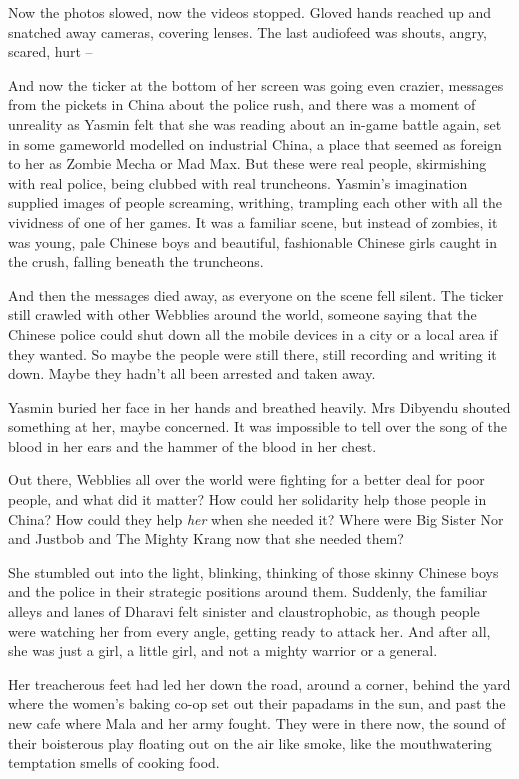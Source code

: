 Now the photos slowed, now the videos stopped. Gloved hands reached
up and snatched away cameras, covering lenses. The last audiofeed
was shouts, angry, scared, hurt --

And now the ticker at the bottom of her screen was going even
crazier, messages from the pickets in China about the police rush,
and there was a moment of unreality as Yasmin felt that she was
reading about an in-game battle again, set in some gameworld
modelled on industrial China, a place that seemed as foreign to her
as Zombie Mecha or Mad Max. But these were real people, skirmishing
with real police, being clubbed with real truncheons. Yasmin's
imagination supplied images of people screaming, writhing,
trampling each other with all the vividness of one of her games. It
was a familiar scene, but instead of zombies, it was young, pale
Chinese boys and beautiful, fashionable Chinese girls caught in the
crush, falling beneath the truncheons.

And then the messages died away, as everyone on the scene fell
silent. The ticker still crawled with other Webblies around the
world, someone saying that the Chinese police could shut down all
the mobile devices in a city or a local area if they wanted. So
maybe the people were still there, still recording and writing it
down. Maybe they hadn't all been arrested and taken away.

Yasmin buried her face in her hands and breathed heavily. Mrs
Dibyendu shouted something at her, maybe concerned. It was
impossible to tell over the song of the blood in her ears and the
hammer of the blood in her chest.

Out there, Webblies all over the world were fighting for a better
deal for poor people, and what did it matter? How could her
solidarity help those people in China? How could they help
\emph{her} when she needed it? Where were Big Sister Nor and
Justbob and The Mighty Krang now that she needed them?

She stumbled out into the light, blinking, thinking of those skinny
Chinese boys and the police in their strategic positions around
them. Suddenly, the familiar alleys and lanes of Dharavi felt
sinister and claustrophobic, as though people were watching her
from every angle, getting ready to attack her. And after all, she
was just a girl, a little girl, and not a mighty warrior or a
general.

Her treacherous feet had led her down the road, around a corner,
behind the yard where the women's baking co-op set out their
papadams in the sun, and past the new cafe where Mala and her army
fought. They were in there now, the sound of their boisterous play
floating out on the air like smoke, like the mouthwatering
temptation smells of cooking food.


